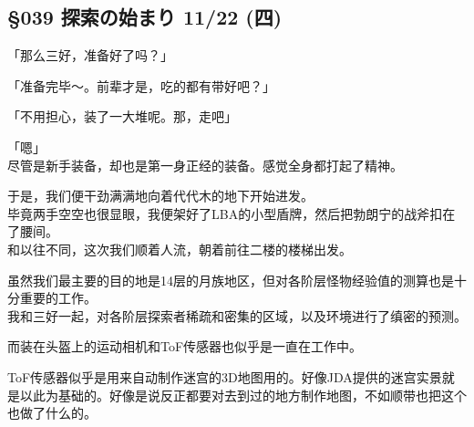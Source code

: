 \subsection{§039 探索の始まり 11/22 (四)}

「那么三好，准备好了吗？」

「准备完毕～。前辈才是，吃的都有带好吧？」

「不用担心，装了一大堆呢。那，走吧」

「嗯」\\

尽管是新手装备，却也是第一身正经的装备。感觉全身都打起了精神。

于是，我们便干劲满满地向着代代木的地下开始进发。\\

毕竟两手空空也很显眼，我便架好了LBA的小型盾牌，然后把勃朗宁的战斧扣在了腰间。\\

和以往不同，这次我们顺着人流，朝着前往二楼的楼梯出发。

虽然我们最主要的目的地是14层的月族地区，但对各阶层怪物经验值的测算也是十分重要的工作。\\

我和三好一起，对各阶层探索者稀疏和密集的区域，以及环境进行了缜密的预测。

而装在头盔上的运动相机和ToF传感器也似乎是一直在工作中。

ToF传感器似乎是用来自动制作迷宫的3D地图用的。好像JDA提供的迷宫实景就是以此为基础的。好像是说反正都要对去到过的地方制作地图，不如顺带也把这个也做了什么的。\\

